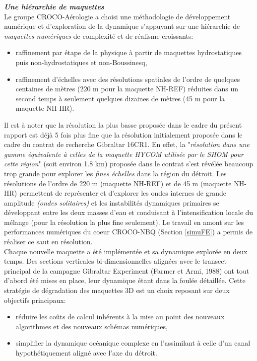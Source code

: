 \documentclass[a4paper,11pt]{report}
\begin{document}
\noindent\textit{\textbf{Une hiérarchie de maquettes}}\\
Le groupe CROCO-Aérologie a choisi une méthodologie de développement numérique et d'exploration de la dynamique s'appuyant sur une hiérarchie de \textit{maquettes numériques} de complexité et de réalisme croissants:
\begin{itemize}
\item raffinement par étape de la physique à partir de maquettes hydrostatiques puis non-hydrostatiques et non-Boussinesq,
\item raffinement d'échelles avec des résolutions spatiales de l'ordre de quelques centaines de mètres (220 m pour la maquette NH-REF) réduites dans un second temps à seulement quelques dizaines de mètres (45 m pour la maquette NH-HR).
\end{itemize}
Il est à noter que la résolution la plus basse proposée dans le cadre du présent rapport est déjà 5 fois plus fine que la résolution initialement proposée dans le cadre du contrat de recherche Gibraltar 16CR1. En effet, la "\textit{résolution dans une gamme équivalente à celles de la maquette HYCOM utilisée par le SHOM pour cette région}" (soit environ 1.8 km) proposée dans le contrat s'est révélée beaucoup trop grande pour explorer les \textit{fines échelles} dans la région du détroit. Les résolutions de l'ordre de 220 m (maquette NH-REF) et de 45 m (maquette NH-HR) permettent de représenter et d'explorer les ondes internes de grande amplitude \textit{(ondes solitaires)} et les instabilités dynamiques primaires se développant entre les deux masses d'eau et conduisant à l'intensification locale du mélange (pour la résolution la plus fine seulement). Le travail en amont sur les performances numériques du coeur CROCO-NBQ (Section \ref{simuFE}) a permis de réaliser ce saut en résolution.\\
\noinden Chaque nouvelle maquette a été implémentée et sa dynamique explorée en deux temps. Des sections verticales bi-dimensionnelles alignées avec le transect principal de la campagne Gibraltar Experiment (Farmer et Armi, 1988) ont tout d'abord été mises en place, leur dynamique étant dans la foulée détaillée. Cette stratégie de dégradation des maquettes 3D est un choix reposant sur deux objectifs principaux:
\begin{itemize}
\item réduire les coûts de calcul inhérents à la mise au point des nouveaux algorithmes et des nouveaux schémas numériques,
\item simplifier la dynamique océanique complexe en l'assimilant à celle d'un canal hypothétiquement aligné avec l'axe du détroit.
\end{itemize}
\end{document}
